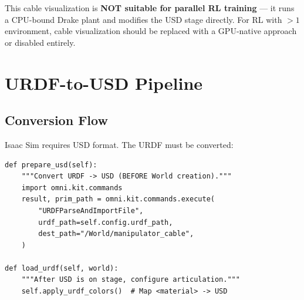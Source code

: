 \documentclass[11pt,a4paper]{article}
\begin{document}
\begin{warnbox}
This cable visualization is \textbf{NOT suitable for parallel RL training} --- it runs a CPU-bound Drake plant and modifies the USD stage directly. For RL with $>1$ environment, cable visualization should be replaced with a GPU-native approach or disabled entirely.
\end{warnbox}


\section{URDF-to-USD Pipeline}
\label{sec:urdf_usd}

\subsection{Conversion Flow}

Isaac Sim requires USD format. The URDF must be converted:

\begin{center}
\end{center}

\begin{lstlisting}[caption={URDF to USD conversion --- \texttt{robots/cup\_manipulator\_tendon\_isaac.py}}]
def prepare_usd(self):
    """Convert URDF -> USD (BEFORE World creation)."""
    import omni.kit.commands
    result, prim_path = omni.kit.commands.execute(
        "URDFParseAndImportFile",
        urdf_path=self.config.urdf_path,
        dest_path="/World/manipulator_cable",
    )

def load_urdf(self, world):
    """After USD is on stage, configure articulation."""
    self.apply_urdf_colors()  # Map <material> -> USD
\end{lstlisting}
\end{document}
